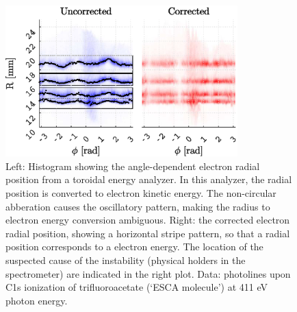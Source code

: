\begin{figure}[h!]
         \centering
    	 \centerline{\includegraphics[width=0.8\textwidth]{Graphics/ESCA_R_circle_corr.eps}}
\caption{Left: Histogram showing the angle-dependent electron radial position from a toroidal energy analyzer. In this analyzer, the radial position is converted to electron kinetic energy. The non-circular abberation causes the oscillatory pattern, making the radius to electron energy conversion ambiguous. Right: the corrected electron radial position, showing a horizontal stripe pattern, so that a radial position corresponds to a electron energy. The location of the suspected cause of the instability (physical holders in the spectrometer) are indicated in the right plot. Data: photolines upon C1s ionization of trifluoroacetate (`ESCA molecule') at 411 eV photon energy.}
\label{R_circle_corr}
\end{figure}


